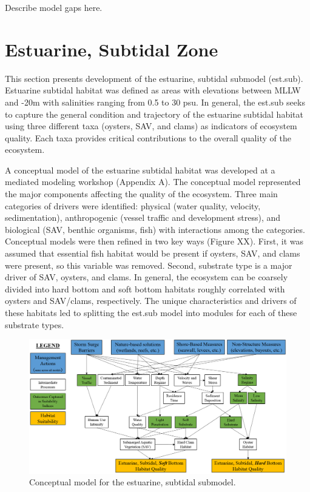 \documentclass[
]{book}
\begin{document}
Describe model gaps here.

\hypertarget{estuarine-subtidal-zone}{%
\section{Estuarine, Subtidal Zone}\label{estuarine-subtidal-zone}}

This section presents development of the estuarine, subtidal submodel (est.sub). Estuarine subtidal habitat was defined as areas with elevations between MLLW and -20m with salinities ranging from 0.5 to 30 psu. In general, the est.sub seeks to capture the general condition and trajectory of the estuarine subtidal habitat using three different taxa (oysters, SAV, and clams) as indicators of ecosystem quality. Each taxa provides critical contributions to the overall quality of the ecosystem.

A conceptual model of the estuarine subtidal habitat was developed at a mediated modeling workshop (Appendix A). The conceptual model represented the major components affecting the quality of the ecosystem. Three main categories of drivers were identified: physical (water quality, velocity, sedimentation), anthropogenic (vessel traffic and development stress), and biological (SAV, benthic organisms, fish) with interactions among the categories. Conceptual models were then refined in two key ways (Figure XX). First, it was assumed that essential fish habitat would be present if oysters, SAV, and clams were present, so this variable was removed. Second, substrate type is a major driver of SAV, oysters, and clams. In general, the ecosystem can be coarsely divided into hard bottom and soft bottom habitats roughly correlated with oysters and SAV/clams, respectively. The unique characteristics and drivers of these habitats led to splitting the est.sub model into modules for each of these substrate types.

\begin{figure}
\includegraphics[width=23.11in]{ZZ_Fig04.06_Est.Sub_ConModel} \caption{Conceptual model for the estuarine, subtidal submodel.}\label{fig:unnamed-chunk-15}
\end{figure}
\end{document}
